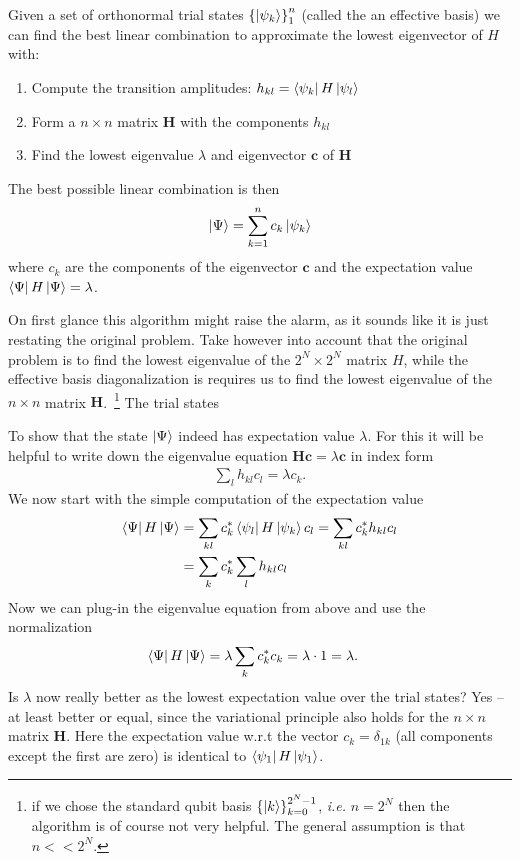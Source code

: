 \begin{algo*}
Given a set of orthonormal trial states $\left\{\ket{\psi_k}\right\}_1^n$ (called the an effective basis) we can find the best linear combination to approximate the lowest eigenvector of $H$ with:
\begin{enumerate}
    \item Compute the transition amplitudes: $h_{kl}=\bra{\psi_k}H\ket{\psi_l}$
    \item Form a $n\times n$ matrix $\mathbf{H}$ with the components $h_{kl}$
    \item Find the lowest eigenvalue $\lambda$ and eigenvector $\mathbf{c}$ of $\mathbf{H}$
\end{enumerate}
The best possible linear combination is then 
\begin{align}
    \ket{\Psi} = \sum_{k=1}^n c_k\ket{\psi_k}
\end{align}
where $c_k$ are the components of the eigenvector $\mathbf{c}$ and the expectation value $\bra{\Psi}H\ket{\Psi} = \lambda$.
\end{algo*}
On first glance this algorithm might raise the alarm, as it sounds like it is just restating the original problem. 
Take however into account that the original problem is to find the lowest eigenvalue of the $2^N\times 2^N$ matrix $H$, while the effective basis diagonalization is requires us to find the lowest eigenvalue of the $n\times n$ matrix $\mathbf{H}$.~\footnote{if we chose the standard qubit basis $\left\{\ket{k} \right\}_{k=0}^{2^N-1}$, \textit{i.e.} $n=2^N$ then the algorithm is of course not very helpful. The general assumption is that $n<<2^N$.}
The trial states 


To show that the state $\ket{\Psi}$ indeed has expectation value $\lambda$. For this it will be helpful to write down the eigenvalue equation $\mathbf{H}\mathbf{c} = \lambda \mathbf{c}$ in index form
\begin{align}
    \sum_{l}h_{kl}c_l = \lambda c_k.
\end{align}
We now start with the simple computation of the expectation value
\begin{align}
    \bra{\Psi}H\ket{\Psi} &= \sum_{kl} c^*_k \bra{\psi_l}H\ket{\psi_k} c_l = \sum_{kl}c_k^* h_{kl} c_l \nonumber\\
    &= \sum_{k} c_k^* \sum_l h_{kl}c_l
\end{align}
Now we can plug-in the eigenvalue equation from above and use the normalization 
\begin{align}
    \bra{\Psi}H\ket{\Psi} &=\lambda \sum_{k} c_k^* c_k = \lambda \cdot 1 = \lambda.
\end{align}
Is $\lambda$ now really better as the lowest expectation value over the trial states?
Yes -- at least better or equal, since the variational principle also holds for the $n\times n$ matrix $\mathbf{H}$. Here the expectation value w.r.t the vector $c_k = \delta_{1k}$ (all components except the first are zero) is identical to $\bra{\psi_1}H\ket{\psi_1}$.


